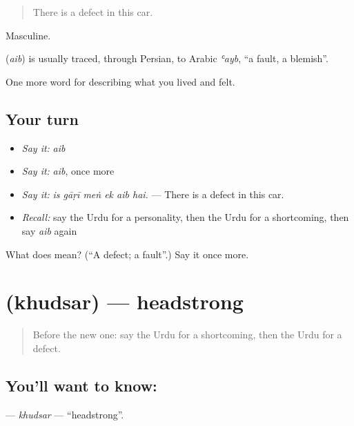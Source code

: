 \begin{quote}
There is a defect in this car.
\end{quote}

Masculine.

\begin{cousinweb}
\textbf{} (\emph{aib}) is usually traced, through Persian, to Arabic \emph{ʿayb}, \textquotedblleft{}a fault, a blemish\textquotedblright{}.
\end{cousinweb}

\begin{grammarlens}[title={What you've built}]
One more word for describing what you lived and felt.
\end{grammarlens}

\subsection*{Your turn}
\begin{itemize}
\raggedright
  \item \emph{Say it:} \emph{aib}
  \item \emph{Say it:} \emph{aib}, once more
  \item \emph{Say it:} \emph{is gāṛī meṅ ek aib hai.} — There is a defect in this car.
  \item \emph{Recall:} say the Urdu for a personality, then the Urdu for a shortcoming, then say \emph{aib} again
\end{itemize}

\begin{tcolorbox}[breakable,colback=teal!4,colframe=teal!35!black,title={Before you move on}]
What does  mean? (\textquotedblleft{}A defect; a fault\textquotedblright{}.) Say it once more.
\end{tcolorbox}
\section[\texorpdfstring{\ur{خودسر} (khudsar)}{خودسر (khudsar)}]{ (khudsar) — headstrong}

\label{lesson:UR-C455-khudsar}



\begin{quote}
Before the new one: say the Urdu for a shortcoming, then the Urdu for a defect.
\end{quote}

\subsection*{You'll want to know: }
\textbf{} — \emph{khudsar} — \textquotedblleft{}headstrong\textquotedblright{}.

